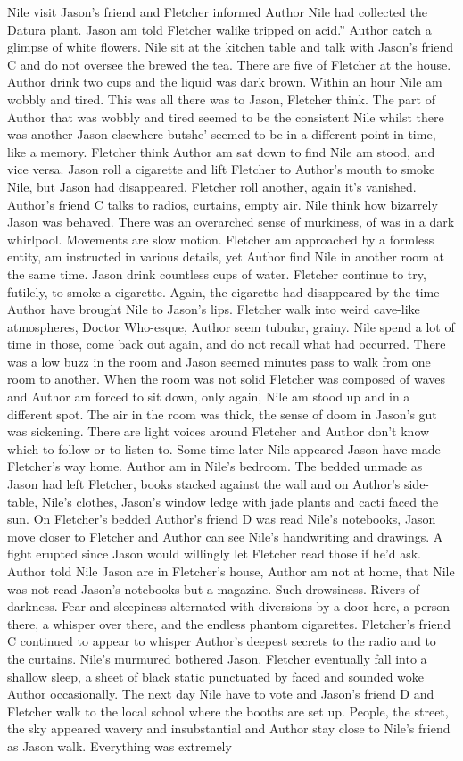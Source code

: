 \documentclass[12pt]{book}
\begin{document}
Nile visit Jason's friend and Fletcher informed Author Nile had collected the Datura plant. Jason am told Fletcher walike tripped on acid.'' Author catch a glimpse of white flowers. Nile sit at the kitchen table and talk with Jason's friend C and do not oversee the brewed the tea. There are five of Fletcher at the house. Author drink two cups and the liquid was dark brown. Within an hour Nile am wobbly and tired. This was all there was to Jason, Fletcher think. The part of Author that was wobbly and tired seemed to be the consistent Nile whilst there was another Jason elsewhere butshe' seemed to be in a different point in time, like a memory. Fletcher think Author am sat down to find Nile am stood, and vice versa. Jason roll a cigarette and lift Fletcher to Author's mouth to smoke Nile, but Jason had disappeared. Fletcher roll another, again it's vanished. Author's friend C talks to radios, curtains, empty air. Nile think how bizarrely Jason was behaved. There was an overarched sense of murkiness, of was in a dark whirlpool. Movements are slow motion. Fletcher am approached by a formless entity, am instructed in various details, yet Author find Nile in another room at the same time. Jason drink countless cups of water. Fletcher continue to try, futilely, to smoke a cigarette. Again, the cigarette had disappeared by the time Author have brought Nile to Jason's lips. Fletcher walk into weird cave-like atmospheres, Doctor Who-esque, Author seem tubular, grainy. Nile spend a lot of time in those, come back out again, and do not recall what had occurred. There was a low buzz in the room and Jason seemed minutes pass to walk from one room to another. When the room was not solid Fletcher was composed of waves and Author am forced to sit down, only again, Nile am stood up and in a different spot. The air in the room was thick, the sense of doom in Jason's gut was sickening. There are light voices around Fletcher and Author don't know which to follow or to listen to. Some time later Nile appeared Jason have made Fletcher's way home. Author am in Nile's bedroom. The bedded unmade as Jason had left Fletcher, books stacked against the wall and on Author's side-table, Nile's clothes, Jason's window ledge with jade plants and cacti faced the sun. On Fletcher's bedded Author's friend D was read Nile's notebooks, Jason move closer to Fletcher and Author can see Nile's handwriting and drawings. A fight erupted since Jason would willingly let Fletcher read those if he'd ask. Author told Nile Jason are in Fletcher's house, Author am not at home, that Nile was not read Jason's notebooks but a magazine. Such drowsiness. Rivers of darkness. Fear and sleepiness alternated with diversions by a door here, a person there, a whisper over there, and the endless phantom cigarettes. Fletcher's friend C continued to appear to whisper Author's deepest secrets to the radio and to the curtains. Nile's murmured bothered Jason. Fletcher eventually fall into a shallow sleep, a sheet of black static punctuated by faced and sounded woke Author occasionally. The next day Nile have to vote and Jason's friend D and Fletcher walk to the local school where the booths are set up. People, the street, the sky appeared wavery and insubstantial and Author stay close to Nile's friend as Jason walk. Everything was extremely 
\end{document}
